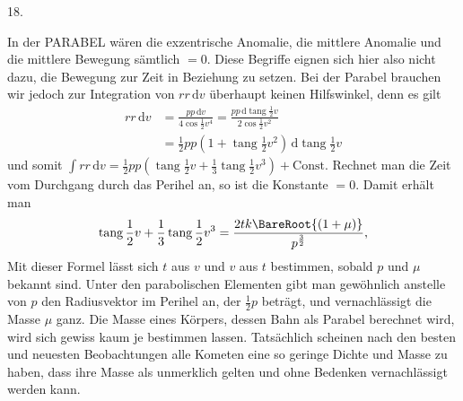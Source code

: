 \par{}
\begin{center}
\hypertarget{native-036-article018}{}18.
\end{center}
In der PARABEL wären die exzentrische Anomalie, die mittlere Anomalie und die mittlere Bewegung sämtlich $=0$. Diese Begriffe eignen sich hier also nicht dazu, die Bewegung zur Zeit in Beziehung zu setzen. Bei der Parabel brauchen wir jedoch zur Integration von $r r\,\mathrm{d}v$ überhaupt keinen Hilfswinkel, denn es gilt
\[
\begin{aligned}
r r\,\mathrm{d}v&=\frac{p p\,\mathrm{d}v}{4\cos\frac{1}{2}v^4}=\frac{p p\,\mathrm{d}\operatorname{tang}\frac{1}{2}v}{2\cos\frac{1}{2}v^2}\\
&=\frac{1}{2}p p(1+\operatorname{tang}\frac{1}{2}v^2)\,\mathrm{d}\operatorname{tang}\frac{1}{2}v
\end{aligned}
\]
und somit $\int r r\,\mathrm{d}v=\frac{1}{2}p p(\operatorname{tang}\frac{1}{2}v+\frac{1}{3}\operatorname{tang}\frac{1}{2}v^3)+\mathrm{Const.}$ Rechnet man die Zeit vom Durchgang durch das Perihel an, so ist die Konstante $=0$. Damit erhält man
\[
\operatorname{tang}\frac{1}{2}v+\frac{1}{3}\operatorname{tang}\frac{1}{2}v^3=\frac{2t k\BareRoot{(1+\mu)}}{p^{\frac{3}{2}}},
\]
Mit dieser Formel lässt sich $t$ aus $v$ und $v$ aus $t$ bestimmen, sobald $p$ und $\mu$ bekannt sind. Unter den parabolischen Elementen gibt man gewöhnlich anstelle von $p$ den Radiusvektor im Perihel an, der $\frac{1}{2}p$ beträgt, und vernachlässigt die Masse $\mu$ ganz. Die Masse eines Körpers, dessen Bahn als Parabel berechnet wird, wird sich gewiss kaum je bestimmen lassen. Tatsächlich scheinen nach den besten und neuesten Beobachtungen alle Kometen eine so geringe Dichte und Masse zu haben, dass ihre Masse als unmerklich gelten und ohne Bedenken vernachlässigt werden kann.
